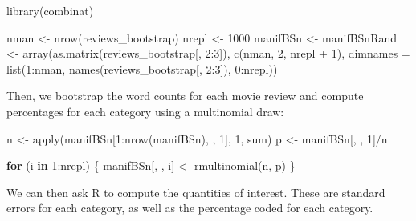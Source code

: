 \documentclass[
]{book}
\newenvironment{Shaded}{\begin{snugshade}}{\end{snugshade}}
\newcommand{\AttributeTok}[1]{\textcolor[rgb]{0.77,0.63,0.00}{#1}}
\newcommand{\ControlFlowTok}[1]{\textcolor[rgb]{0.13,0.29,0.53}{\textbf{#1}}}
\newcommand{\DecValTok}[1]{\textcolor[rgb]{0.00,0.00,0.81}{#1}}
\newcommand{\FunctionTok}[1]{\textcolor[rgb]{0.00,0.00,0.00}{#1}}
\newcommand{\NormalTok}[1]{#1}
\newcommand{\OtherTok}[1]{\textcolor[rgb]{0.56,0.35,0.01}{#1}}
\newcommand{\SpecialCharTok}[1]{\textcolor[rgb]{0.00,0.00,0.00}{#1}}
\begin{document}
\begin{Shaded}
\begin{Highlighting}[]
\FunctionTok{library}\NormalTok{(combinat)}

\NormalTok{nman }\OtherTok{\textless{}{-}} \FunctionTok{nrow}\NormalTok{(reviews\_bootstrap)}
\NormalTok{nrepl }\OtherTok{\textless{}{-}} \DecValTok{1000}
\NormalTok{manifBSn }\OtherTok{\textless{}{-}}\NormalTok{ manifBSnRand }\OtherTok{\textless{}{-}} \FunctionTok{array}\NormalTok{(}\FunctionTok{as.matrix}\NormalTok{(reviews\_bootstrap[, }
    \DecValTok{2}\SpecialCharTok{:}\DecValTok{3}\NormalTok{]), }\FunctionTok{c}\NormalTok{(nman, }\DecValTok{2}\NormalTok{, nrepl }\SpecialCharTok{+} \DecValTok{1}\NormalTok{), }\AttributeTok{dimnames =} \FunctionTok{list}\NormalTok{(}\DecValTok{1}\SpecialCharTok{:}\NormalTok{nman, }\FunctionTok{names}\NormalTok{(reviews\_bootstrap[, }
    \DecValTok{2}\SpecialCharTok{:}\DecValTok{3}\NormalTok{]), }\DecValTok{0}\SpecialCharTok{:}\NormalTok{nrepl))}
\end{Highlighting}
\end{Shaded}

Then, we bootstrap the word counts for each movie review and compute percentages for each category using a multinomial draw:

\begin{Shaded}
\begin{Highlighting}[]
\NormalTok{n }\OtherTok{\textless{}{-}} \FunctionTok{apply}\NormalTok{(manifBSn[}\DecValTok{1}\SpecialCharTok{:}\FunctionTok{nrow}\NormalTok{(manifBSn), , }\DecValTok{1}\NormalTok{], }\DecValTok{1}\NormalTok{, sum)}
\NormalTok{p }\OtherTok{\textless{}{-}}\NormalTok{ manifBSn[, , }\DecValTok{1}\NormalTok{]}\SpecialCharTok{/}\NormalTok{n}

\ControlFlowTok{for}\NormalTok{ (i }\ControlFlowTok{in} \DecValTok{1}\SpecialCharTok{:}\NormalTok{nrepl) \{}
\NormalTok{    manifBSn[, , i] }\OtherTok{\textless{}{-}} \FunctionTok{rmultinomial}\NormalTok{(n, p)}
\NormalTok{\}}
\end{Highlighting}
\end{Shaded}

We can then ask R to compute the quantities of interest. These are standard errors for each category, as well as the percentage coded for each category.
\end{document}
